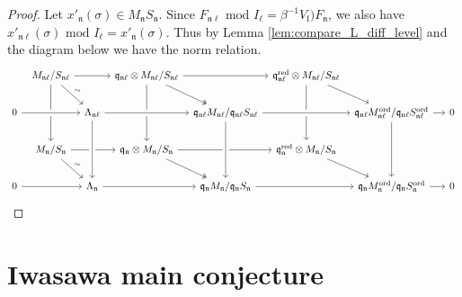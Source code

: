 \documentclass[leqno]{amsart}
\newcommand{\red}{\textnormal{red}}
\newcommand{\ord}{\textnormal{ord}}
\newcommand{\fn}{\mathfrak{n}}
\newcommand{\fl}{\mathfrak{l}}
\newcommand{\fq}{\mathfrak{q}}
\theoremstyle{definition}
\theoremstyle{remark}
\begin{document}
\begin{proof}

Let $x'_{\fn}(\sigma)\in M_{\fn}S_{\fn}$.
Since $F_{\fn\ell}\text{ mod }I_\ell=
\beta^{-1}V_\fl)F_\fn$,
we also have 
$x'_{\fn\ell}(\sigma)\text{ mod }I_\ell
=x'_\fn(\sigma)$.
Thus by Lemma \ref{lem:compare_L_diff_level}
and the diagram below
we have the norm relation.
\begin{equation*}
\begin{tikzcd}[column sep=tiny]
& M_{\fn\ell}/S_{\fn\ell}\arrow{dd} \arrow[rd,"\sim"]\arrow[rr]
&& \fq_{\fn\ell}\otimes M_{\fn\ell}/S_{\fn\ell}
	\arrow[rd,twoheadrightarrow]\arrow[rr]\arrow[dd]
&& \fq_{\fn\ell}^{\red}\otimes M_{\fn\ell}/S_{\fn\ell}\arrow[dd]\arrow[rd]\\
0 \arrow[crossing over]{rr} 
&& \Lambda_{\fn\ell}
	\arrow[crossing over]{dd} \arrow[crossing over]{rr} 
&& \fq_{\fn\ell}M_{\fn\ell}/\fq_{\fn\ell}S_{\fn\ell}
	\arrow[crossing over]{dd}\arrow[crossing over]{rr} 
&& \fq_{\fn\ell}M_{\fn\ell}^{\ord}/\fq_{\fn\ell}S^{\ord}_{\fn\ell}
	\arrow{dd} \arrow[rr] && 0\\
& M_{\fn}/S_{\fn}\arrow{rr}\arrow[rd,"\sim"]
&& \fq_{\fn}\otimes M_{\fn}/S_{\fn}
	\arrow{rr} \arrow[rd,twoheadrightarrow]
&& \fq_{\fn}^{\red}\otimes M_{\fn}/S_{\fn} \arrow[rd]& & & \\
0 \arrow[crossing over]{rr} 
&& \Lambda_{\fn} \arrow[crossing over]{rr} 
&& \fq_{\fn}M_{\fn}/\fq_{\fn}S_{\fn}\arrow[crossing over]{rr} 
&& \fq_{\fn}M_{\fn}^{\ord}/\fq_{\fn}S_{\fn}^{\ord} \arrow[rr] && 0
\arrow[from=2-3,to=4-3,crossing over]
\arrow[from=2-5,to=4-5,crossing over]
\end{tikzcd}
\end{equation*}

	
\end{proof}


\section{Iwasawa main conjecture}
\end{document}
